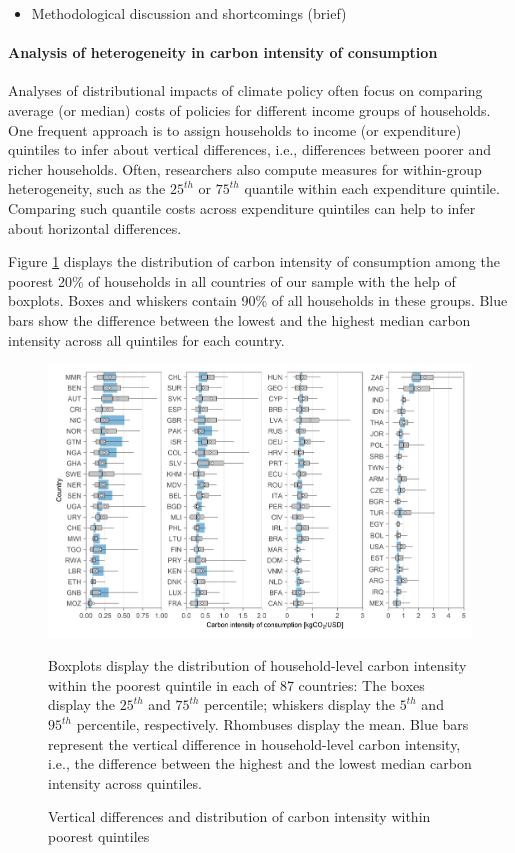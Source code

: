 \documentclass[12pt, a4paper]{article}
\newenvironment{subcaption}
{\strut
\vspace{-5pt}
\begin{minipage}[b]{0.9\textwidth}
  \hspace*{-\parindent}
  \footnotesize}
 {\end{minipage}}
\begin{document}
\begin{itemize}
    \item Methodological discussion and shortcomings (brief)
\end{itemize}

\paragraph{Analysis of heterogeneity in carbon intensity of consumption} Analyses of distributional impacts of climate policy often focus on comparing average (or median) costs of policies for different income groups of households. One frequent approach is to assign households to income (or expenditure) quintiles to infer about vertical differences, i.e., differences between poorer and richer households. Often, researchers also compute measures for within-group heterogeneity, such as the $25^{th}$ or $75^{th}$ quantile within each expenditure quintile. Comparing such quantile costs across expenditure quintiles can help to infer about horizontal differences.

Figure \ref{fig:fig_1} displays the distribution of carbon intensity of consumption among the poorest 20\% of households in all countries of our sample with the help of boxplots. Boxes and whiskers contain 90\% of all households in these groups. Blue bars show the difference between the lowest and the highest median carbon intensity across all quintiles for each country.

\begin{figure}[ht!]
    \centering
    \includegraphics{Figure 1/Figure_1}
    \caption{Vertical differences and distribution of carbon intensity within poorest quintiles}
    \label{fig:fig_1}
    \begin{subcaption}
    Boxplots display the distribution of household-level carbon intensity within the poorest quintile in each of 87 countries: The boxes display the $25^{th}$ and $75^{th}$ percentile; whiskers display the $5^{th}$ and $95^{th}$ percentile, respectively. Rhombuses display the mean. Blue bars represent the vertical difference in household-level carbon intensity, i.e., the difference between the highest and the lowest median carbon intensity across quintiles.
    \end{subcaption}
\end{figure}
\end{document}
